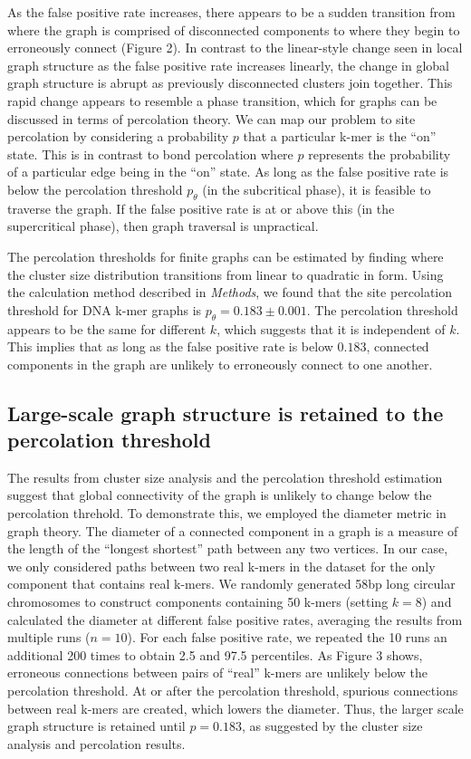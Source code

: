 \documentclass[12pt]{article} \usepackage{simplemargins}
\begin{document}
As the false positive rate increases, there appears to be a sudden
transition from where the graph is comprised of disconnected 
components to where they begin to erroneously connect (Figure 2). 
In contrast to the linear-style change seen 
in local graph structure as the false positive rate increases linearly, 
the change in global graph structure is abrupt as previously disconnected 
clusters join together.  
This rapid change appears to resemble a phase transition, which for graphs
can be 
discussed in terms of percolation theory. We can map 
our problem to site percolation by considering a probability $p$ that a 
particular k-mer is the ``on'' state. This is in contrast to bond percolation where 
$p$ represents the probability of a particular edge being in the ``on'' state. As
long as the false positive rate is below the percolation threshold $p_\theta$ (in
the subcritical phase), it is feasible to traverse the graph. If the
false positive rate is at or above this (in the supercritical phase), then graph
traversal is unpractical.


The percolation thresholds for finite graphs can be estimated by
finding where the cluster size distribution transitions from linear to
quadratic in form.  Using the calculation method described
in \emph{Methods}, we found that the site percolation threshold for
DNA k-mer graphs is $p_\theta = 0.183 \pm 0.001$.  The percolation
threshold appears to be the same for different $k$, which suggests
that it is independent of $k$. This implies that as long as
the false positive rate is below $0.183$, connected components in the
graph are unlikely to erroneously connect to one another.

\subsection{Large-scale graph structure is retained to the percolation threshold}
The results from cluster size analysis and the percolation threshold 
estimation suggest that 
global connectivity of the graph is unlikely 
to change below the percolation threhold. To demonstrate this, we employed 
the diameter metric in graph theory.  
The diameter of a connected component in a graph is a measure of 
the length of the ``longest shortest'' 
path between any two vertices\cite{bondy2008graph}.
In our case, we only considered paths between two real k-mers
in the dataset for the only component that contains real k-mers. 
We randomly generated 58bp long circular
chromosomes to construct components containing 50 k-mers (setting $k=8$) and 
calculated the diameter at different false positive rates, averaging
the results from multiple runs ($n=10$). For each false positive rate, we 
repeated the 10 runs an additional 200 times to obtain 2.5 and 97.5 
percentiles. 
As Figure 3 shows, 
erroneous connections between pairs of ``real'' k-mers are unlikely
below the 
percolation threshold. At or after the percolation threshold, spurious connections 
between real k-mers are created, which lowers the diameter. 
Thus, the larger scale graph structure is retained until $p=0.183$, as suggested by the cluster size analysis and percolation results.
\end{document}
